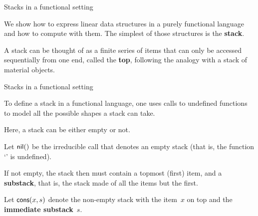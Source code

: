 %
\begin{frame}{Stacks in a functional setting}

  We show how to express linear data structures in a purely functional
  language and how to compute with them. The simplest of those
  structures is the \textbf{stack}.

  \bigskip

  A stack can be thought of as a finite series of items that can only
  be accessed sequentially from one end, called the \textbf{top},
  following the analogy with a stack of material objects.

\end{frame}

%
\begin{frame}{Stacks in a functional setting}

  To define a stack in a functional language, one uses calls to
  undefined functions to model all the possible shapes a stack can
  take.

  \bigskip

  Here, a stack can be either empty or not.

  \bigskip

  Let \(\textsf{nil}()\) be the irreducible call that denotes an empty
  stack (that is, the function `' is undefined).

  \bigskip

  If not empty, the stack then must contain a topmost (first) item,
  and a \textbf{substack}, that is, the stack made of all the items
  but the first.

  \bigskip

  Let \(\textsf{cons}(x,s)\) denote the non\hyp{}empty stack with the
  item~\(x\) on top and the \textbf{immediate substack}~\(s\).

\end{frame}

